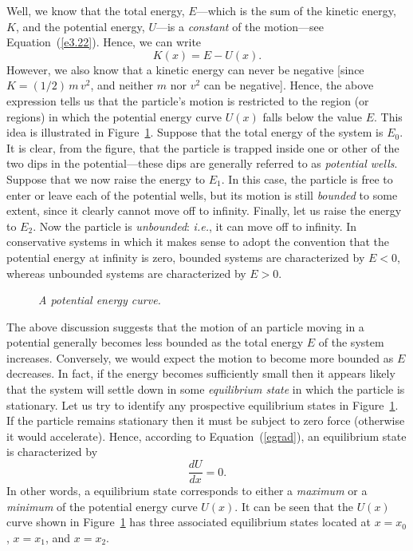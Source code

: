 Well, we know that the total energy, $E$---which is the sum of the kinetic
energy, $K$, and the potential energy, $U$---is a {\em constant} of the motion---see Equation~(\ref{e3.22}).
Hence, we can write
\begin{equation}\label{e555}
K(x) = E - U(x).
\end{equation}
However, we also know that a kinetic energy can never be negative [since $K=(1/2)\,m\,v^2$, and neither
$m$ nor $v^2$ can be negative]. Hence, the above
expression tells us that the particle's motion  is restricted to the
region (or regions) in which the potential energy curve $U(x)$ falls
below the value $E$. This idea is illustrated in Figure~\ref{f43}.
Suppose that the total energy of the system is $E_0$. It is clear, from
the figure, that the particle is trapped inside one or other of the two dips
in the potential---these dips are
generally referred to as {\em potential wells}. 
Suppose that we now raise the energy to $E_1$. In this
case, the particle is free to enter or leave each of the potential wells, but
its motion is still {\em bounded}\/ to some extent, since it clearly cannot move off to
infinity. Finally, let us raise the energy to $E_2$. Now the
particle is {\em unbounded}: {\em i.e.}, it can move off to infinity. In conservative systems
in which it makes sense to adopt the convention that the potential
energy at infinity is zero, bounded systems are characterized
by $E<0$, whereas unbounded systems are characterized by  $E>0$. 

\begin{figure}
\epsfysize=2.25in
\centerline{}
\caption{\em A potential energy curve.}\label{f43}   
\end{figure}

The above discussion suggests that the motion of an particle moving in a potential
generally becomes less bounded as the total energy $E$ of the system increases. 
 Conversely, we would expect the motion to become more bounded as $E$ decreases.
In fact, if the energy becomes sufficiently small then it appears likely that the
system will settle down in some {\em equilibrium state}\/ in which the particle is stationary.
Let us try  to identify any  prospective equilibrium states in Figure~\ref{f43}.
If the particle remains stationary then it must be subject to zero force (otherwise
it would accelerate). Hence, according to Equation~(\ref{egrad}), an equilibrium
state is characterized by
\begin{equation}
\frac{dU}{dx} = 0.
\end{equation}
In other words, a equilibrium state corresponds to either a {\em maximum}\/
or a {\em minimum}\/ of the potential energy curve $U(x)$. It can
be seen that the $U(x)$ curve shown in Figure~\ref{f43} has
three associated equilibrium states located at
$x=x_0$, $x=x_1$, and $x=x_2$. 

